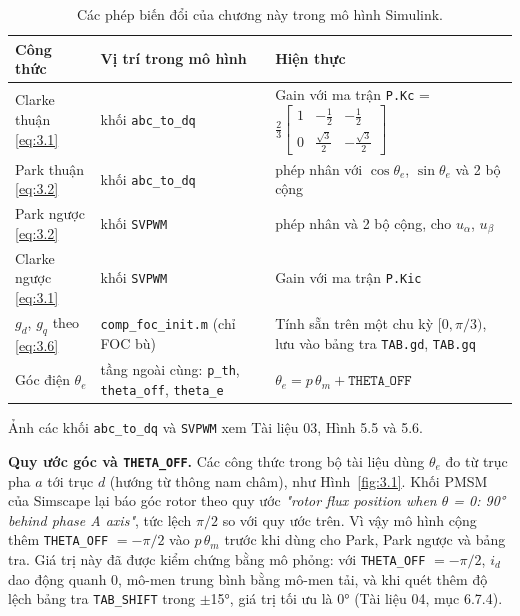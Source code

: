 \begin{table}[H]
\centering\small
\caption{Các phép biến đổi của chương này trong mô hình Simulink.}\label{tab:3.1}
\begin{tabularx}{\linewidth}{@{}l>{\raggedright\arraybackslash}X>{\raggedright\arraybackslash}X@{}}
\toprule
Công thức & Vị trí trong mô hình & Hiện thực \\ \midrule
Clarke thuận \eqref{eq:3.1} & khối \texttt{abc\_to\_dq} & Gain với ma trận \texttt{P.Kc} = $\tfrac23\begin{bmatrix}1 & -\frac12 & -\frac12\\ 0 & \frac{\sqrt3}{2} & -\frac{\sqrt3}{2}\end{bmatrix}$ \\
Park thuận \eqref{eq:3.2} & khối \texttt{abc\_to\_dq} & 4 phép nhân với $\cos\theta_e$, $\sin\theta_e$ và 2 bộ cộng \\
Park ngược \eqref{eq:3.2} & khối \texttt{SVPWM} & 4 phép nhân và 2 bộ cộng, cho $u_\alpha$, $u_\beta$ \\
Clarke ngược \eqref{eq:3.1} & khối \texttt{SVPWM} & Gain với ma trận \texttt{P.Kic} \\
$g_d$, $g_q$ theo \eqref{eq:3.6} & \texttt{comp\_foc\_init.m} (chỉ FOC bù) & Tính sẵn trên một chu kỳ $[0, \pi/3)$, lưu vào bảng tra \texttt{TAB.gd}, \texttt{TAB.gq} \\
Góc điện $\theta_e$ & tầng ngoài cùng: \texttt{p\_th}, \texttt{theta\_off}, \texttt{theta\_e} & $\theta_e = p\,\theta_m + \texttt{THETA\_OFF}$ \\
\bottomrule
\end{tabularx}
\end{table}

Ảnh các khối \texttt{abc\_to\_dq} và \texttt{SVPWM} xem Tài liệu 03, Hình 5.5 và 5.6.

\textbf{Quy ước góc và \texttt{THETA\_OFF}.} Các công thức trong bộ tài liệu dùng $\theta_e$ đo từ trục pha $a$ tới trục $d$ (hướng từ thông nam châm), như Hình~\ref{fig:3.1}. Khối PMSM của Simscape lại báo góc rotor theo quy ước \emph{"rotor flux position when $\theta$ = 0: 90° behind phase A axis"}, tức lệch $\pi/2$ so với quy ước trên. Vì vậy mô hình cộng thêm \texttt{THETA\_OFF} $= -\pi/2$ vào $p\,\theta_m$ trước khi dùng cho Park, Park ngược và bảng tra. Giá trị này đã được kiểm chứng bằng mô phỏng: với \texttt{THETA\_OFF} $= -\pi/2$, $i_d$ dao động quanh 0, mô-men trung bình bằng mô-men tải, và khi quét thêm độ lệch bảng tra \texttt{TAB\_SHIFT} trong $\pm$15°, giá trị tối ưu là 0° (Tài liệu 04, mục 6.7.4).
